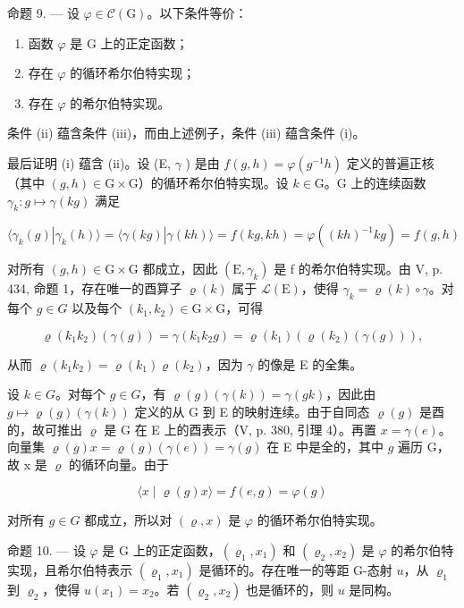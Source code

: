 命题 9. --- 设 \(\varphi\in\mathcal{C}(\mathrm{G})\)。以下条件等价：

\begin{enumerate}
\def\labelenumi{(\roman{enumi})}
\item
  函数 \(\varphi\) 是 G 上的正定函数；
\item
  存在 \(\varphi\) 的循环希尔伯特实现；
\item
  存在 \(\varphi\) 的希尔伯特实现。
\end{enumerate}

条件 (ii) 蕴含条件 (iii)，而由上述例子，条件 (iii) 蕴含条件 (i)。

最后证明 (i) 蕴含 (ii)。设 (E, \(\gamma\) ) 是由 \(f(g,h)=\varphi(g^{-1}h)\) 定义的普遍正核（其中 \((g,h)\in\mathrm{G}\times\mathrm{G}\)）的循环希尔伯特实现。设 \(k\in\mathrm{G}\)。G 上的连续函数 \(\gamma_{k}:g\mapsto\gamma(kg)\) 满足

\[
\langle \gamma_ {k} (g) | \gamma_ {k} (h) \rangle = \langle \gamma (k g) | \gamma (k h) \rangle = f (k g, k h) = \varphi ((k h) ^ {- 1} k g) = f (g, h)
\]

对所有 \((g,h)\in\mathrm{G}\times\mathrm{G}\) 都成立，因此 \((\mathrm{E},\gamma_{k})\) 是 f 的希尔伯特实现。由 V, p. 434, 命题 1，存在唯一的酉算子 \(\varrho(k)\) 属于 \(\mathcal{L}(\mathrm{E})\)，使得 \(\gamma_{k}=\varrho(k)\circ\gamma\)。对每个 \(g\in G\) 以及每个 \((k_{1},k_{2})\in\mathrm{G}\times\mathrm{G}\)，可得

\[
\varrho (k _ {1} k _ {2}) (\gamma (g)) = \gamma (k _ {1} k _ {2} g) = \varrho (k _ {1}) (\varrho (k _ {2}) (\gamma (g))),
\]

从而 \(\varrho(k_1k_2) = \varrho(k_1)\varrho(k_2)\)，因为 \(\gamma\) 的像是 E 的全集。

设 \(k \in G\)。对每个 \(g \in G\)，有 \(\varrho(g)(\gamma(k)) = \gamma(gk)\)，因此由 \(g \mapsto \varrho(g)(\gamma(k))\) 定义的从 G 到 E 的映射连续。由于自同态 \(\varrho(g)\) 是酉的，故可推出 \(\varrho\) 是 G 在 E 上的酉表示（V, p. 380, 引理 4）。再置 \(x = \gamma(e)\)。向量集 \(\varrho(g)x = \varrho(g)(\gamma(e)) = \gamma(g)\) 在 E 中是全的，其中 \(g\) 遍历 G，故 x 是 \(\varrho\) 的循环向量。由于

\[
\langle x \mid \varrho (g) x \rangle = f (e, g) = \varphi (g)
\]

对所有 \(g \in G\) 都成立，所以对 \((\varrho, x)\) 是 \(\varphi\) 的循环希尔伯特实现。

命题 10. — 设 \(\varphi\) 是 G 上的正定函数，\((\varrho_{1}, x_{1})\) 和 \((\varrho_{2}, x_{2})\) 是 \(\varphi\) 的希尔伯特实现，且希尔伯特表示 \((\varrho_{1}, x_{1})\) 是循环的。存在唯一的等距 G-态射 \(u\)，从 \(\varrho_{1}\) 到 \(\varrho_{2}\)，使得 \(u(x_{1}) = x_{2}\)。若 \((\varrho_{2}, x_{2})\) 也是循环的，则 \(u\) 是同构。

